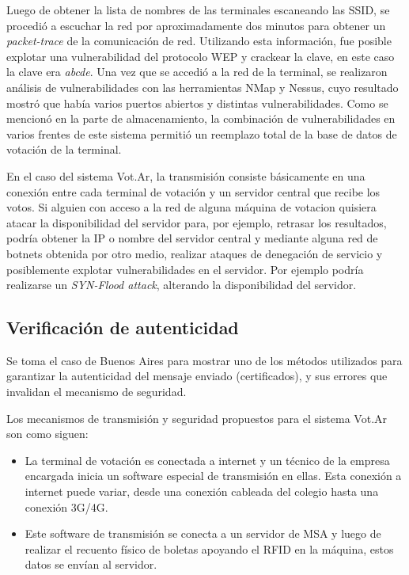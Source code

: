 Luego de obtener la lista de nombres de las terminales escaneando las SSID, se procedió a escuchar la red por aproximadamente dos minutos para obtener un \textit{packet-trace} de la comunicación de red. Utilizando esta información, fue posible explotar una vulnerabilidad del protocolo WEP y crackear la clave, en este caso la clave era \textit{abcde}. Una vez que se accedió a la red de la terminal, se realizaron análisis de vulnerabilidades con las herramientas NMap\cite{nmap} y Nessus\cite{nessus}, cuyo resultado mostró que había varios puertos abiertos y distintas vulnerabilidades. Como se mencionó en la parte de almacenamiento, la combinación de vulnerabilidades en varios frentes de este sistema permitió un reemplazo total de la base de datos de votación de la terminal.


En el caso del sistema Vot.Ar, la transmisión consiste básicamente en una conexión entre cada terminal de votación y un servidor central que recibe los votos. Si alguien con acceso a la red de alguna máquina de votacion quisiera atacar la disponibilidad del servidor para, por ejemplo, retrasar los resultados, podría obtener la IP o nombre del servidor central y mediante alguna red de botnets obtenida por otro medio, realizar ataques de denegación de servicio y posiblemente explotar vulnerabilidades en el servidor. Por ejemplo podría realizarse un \textit{SYN-Flood attack}, alterando la disponibilidad del servidor.

\subsection{Verificación de autenticidad}

Se toma el caso de Buenos Aires para mostrar uno de los métodos utilizados para garantizar la autenticidad del mensaje enviado (certificados), y sus errores que invalidan el mecanismo de seguridad.

Los mecanismos de transmisión y seguridad propuestos para el sistema Vot.Ar son como siguen\cite{votar}:
\begin{itemize}
	\item La terminal de votación es conectada a internet y un técnico de la empresa encargada inicia un software especial de transmisión en ellas. Esta conexión a internet puede variar, desde una conexión cableada del colegio hasta una conexión 3G/4G.
	\item Este software de transmisión se conecta a un servidor de MSA y luego de realizar el recuento físico de boletas apoyando el RFID en la máquina, estos datos se envían al servidor.
\end{itemize}

